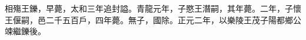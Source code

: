 
\begin{pinyinscope}
相殤王鑠，早薨，太和三年追封謚。青龍元年，子愍王潛嗣，其年薨。二年，子懷王偃嗣，邑二千五百戶，四年薨。無子，國除。正元二年，以樂陵王茂子陽都鄉公竦繼鑠後。


\end{pinyinscope}